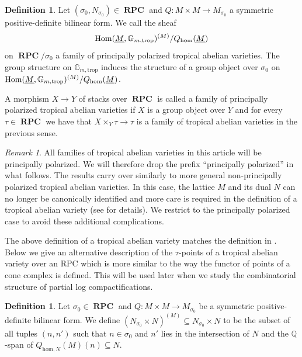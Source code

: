 \documentclass[11pt]{amsart}
\theoremstyle{definition}
\newtheorem{definition}[theorem]{Definition}
\theoremstyle{remark}
\newtheorem{remark}[theorem]{Remark}
\def\hom{\mathrm{hom}}
\def\trop{\mathrm{trop}}
\DeclareMathOperator{\RPC}{\mathbf{RPC}}
\DeclareMathOperator{\Hom}{\textup{Hom}}
\begin{document}
\begin{definition}
	Let $(\sigma_0,N_{\sigma_0})\in \RPC$ and $Q:M\times M\to M_{\sigma_0}$ a symmetric positive-definite bilinear form. We
	call the sheaf
	$$\Hom(\underline{M},\mathbb{G}_{m,\trop})^{(M)}/Q_{\hom}(\underline{M})$$
	on $\RPC/\sigma_0$
	a family of principally polarized tropical abelian varieties. The group structure on $\mathbb{G}_{m,\trop}$ induces the structure of a group object
	over $\sigma_0$ on $\Hom(\underline{M},\mathbb{G}_{m,\trop})^{(M)}/Q_{\hom}(\underline{M})$.

	A morphism $X\to Y$ of stacks over $\RPC$ is called a family of
	principally polarized tropical abelian varieties if $X$ is a group object over $Y$ and
	for every $\tau\in \RPC$ we have that $X\times_Y \tau\to \tau$ is a family of tropical
	abelian varieties in the previous sense.
\end{definition}

\begin{remark}
	All families of tropical abelian varieties in this article will
	be principally polarized. We will therefore drop the prefix
	``principally polarized'' in what follows. The results carry over similarly to more general
	non-principally polarized tropical abelian varieties. In this case, the lattice $M$ and its dual $N$
	can no longer be canonically identified and more care is required in the definition of a tropical abelian
	variety (see \cite{LogarithmicAbeKajiwa2008} for details).
	We restrict to the principally polarized case to avoid these additional complications.
\end{remark}

The above definition of a tropical abelian variety matches the definition in \cite{LogarithmicAbeKajiwa2008}.
Below we give an alternative description of the $\tau$-points of a tropical abelian variety over an RPC which
is more similar to the way the functor of points of a cone complex is defined. This will be used later when
we study the combinatorial structure of partial log compactifications.

\begin{definition}
	Let $\sigma_0\in \RPC$ and $Q:M\times M\to M_{\sigma_0}$ be a symmetric positive-definite bilinear form.
	We define $(N_{\sigma_0}\times N)^{(M)}\subseteq N_{\sigma_0}\times N$ to be the subset of all tuples $(n,n')$
	such that $n\in \sigma_0$ and $n'$ lies in the intersection of $N$ and the $\mathbb{Q}$-span of $Q_{\hom,N}(M)(n)\subseteq N$.
\end{definition}
\end{document}
